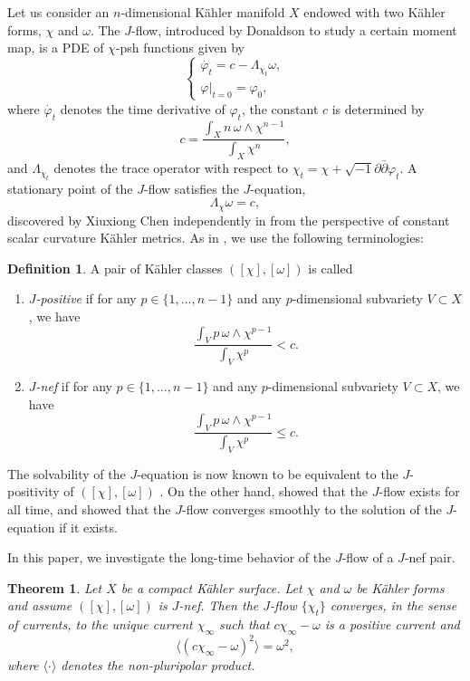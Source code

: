 \documentclass{amsart}
\numberwithin{equation}{section}
\theoremstyle{plain}
\newtheorem{thm}[equation]{Theorem}
\theoremstyle{definition}
\newtheorem{defn}[equation]{Definition}
\theoremstyle{remark}
\newcommand{\delb}{\sqrt{-1}\partial\bar{\partial}}
\begin{document}
Let us consider an $n$-dimensional K{\"a}hler manifold $X$ endowed with two K{\"a}hler forms, $\chi$ and $\omega$. The $J$-flow, introduced by Donaldson \cite{Donaldson} to study a certain moment map, is a PDE of $\chi$-psh functions given by
\begin{equation*}
        \begin{cases}
            \dot{\varphi_t}=c-\Lambda_{\chi_t}\omega, \\
            \varphi|_{t=0}=\varphi_0,
        \end{cases}
\end{equation*}
where $\dot{\varphi_t}$ denotes the time derivative of $\varphi_t$, the constant $c$ is determined by 
$$c=\frac{\int_X n \, \omega\wedge\chi^{n-1}}{\int_X \chi^n},$$
and $\Lambda_{\chi_t}$ denotes the trace operator with respect to $\chi_t=\chi+\delb\varphi_t$. 
A stationary point of the $J$-flow satisfies the $J$-equation, 
\begin{equation*}
    \Lambda_\chi\omega=c,
\end{equation*}
 discovered by Xiuxiong Chen independently in \cite{XChen} from the perspective of constant scalar curvature K{\"a}hler metrics.
As in \cite{Song}, 
we use the following terminologies:
\begin{defn}
    A pair of K{\"a}hler classes $([\chi],[\omega])$ is called 
    \begin{enumerate}
        \item \textit{$J$-positive} if for any $p \in \{1,\dots,n-1\}$ and any $p$-dimensional subvariety $V \subset X$, 
        we have
        $$\frac{\int_V p \, \omega\wedge\chi^{p-1}}{\int_V \chi^p} < c.$$
        \item \textit{$J$-nef} if for any $p \in \{1,\dots,n-1\}$ and any $p$-dimensional subvariety $V \subset X$, 
        we have
        $$\frac{\int_V p \, \omega\wedge\chi^{p-1}}{\int_V \chi^p} \le c.$$
    \end{enumerate}
\end{defn}
The solvability of the $J$-equation is now known to be equivalent to the $J$-positivity of $([\chi],[\omega])$ \cite{GChen,Datar-Pingali,Song}. On the other hand, \cite{XChen2} showed that the $J$-flow exists for all time, and \cite{SW} showed that the $J$-flow converges smoothly to the solution of the $J$-equation if it exists.

In this paper, we investigate the long-time behavior of the $J$-flow of a $J$-nef pair.

\begin{thm}\label{thmJmain}
    Let $X$ be a compact K{\"a}hler surface. Let $\chi$ and $\omega$ be K{\"a}hler forms and assume $([\chi],[\omega])$ is $J$-nef. Then the $J$-flow $\{\chi_t\}$ converges, in the sense of currents, to the unique current $\chi_\infty$ such that $c\chi_\infty-\omega$ is a positive current and
    \begin{equation}\label{eqJMA}
        \langle (c\chi_\infty-\omega)^2 \rangle=\omega^2,
    \end{equation}
    where $\langle\cdot\rangle$ denotes the non-pluripolar product.
\end{thm}
\end{document}
